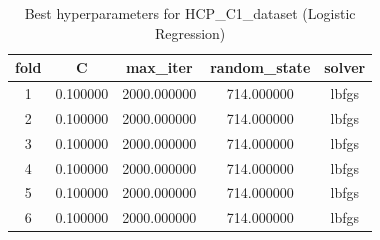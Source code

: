 \begin{table}[htbp]
\caption{Best hyperparameters for HCP_C1_dataset (Logistic Regression)}
\label{tab:best_hyperparams_HCP_C1_dataset}
\begin{tabular}{ccccc}
\toprule
fold & C & max_iter & random_state & solver \\
\midrule
1 & 0.100000 & 2000.000000 & 714.000000 & lbfgs \\
2 & 0.100000 & 2000.000000 & 714.000000 & lbfgs \\
3 & 0.100000 & 2000.000000 & 714.000000 & lbfgs \\
4 & 0.100000 & 2000.000000 & 714.000000 & lbfgs \\
5 & 0.100000 & 2000.000000 & 714.000000 & lbfgs \\
6 & 0.100000 & 2000.000000 & 714.000000 & lbfgs \\
\bottomrule
\end{tabular}
\end{table}
